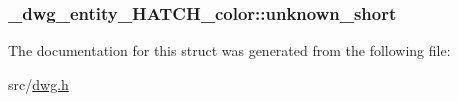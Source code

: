\hypertarget{struct__dwg__entity__HATCH__color_a2562aa1927e44508af50aa77c5df728f}{
\subsubsection[{unknown\-\_\-short}]{ {\bf \-\_\-dwg\-\_\-entity\-\_\-\-H\-A\-T\-C\-H\-\_\-color\-::unknown\-\_\-short}}}\label{struct__dwg__entity__HATCH__color_a2562aa1927e44508af50aa77c5df728f}


\-The documentation for this struct was generated from the following file\-:\begin{DoxyCompactItemize}
\item 
src/\hyperlink{dwg_8h}{dwg.\-h}\end{DoxyCompactItemize}
